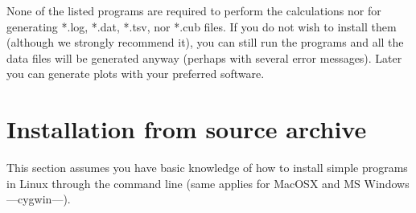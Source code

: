 None of the listed programs are required to perform the calculations nor for generating *.log, *.dat, *.tsv, nor *.cub files. If you do not wish to install them (although we strongly recommend it), you can still run the programs and all the data files will be generated anyway (perhaps with several error messages). Later you can generate plots with your preferred software.

\section{Installation from source archive}

This section assumes you have basic knowledge of how to install simple programs in Linux through the command line (same applies for MacOSX and MS Windows ---cygwin---).

